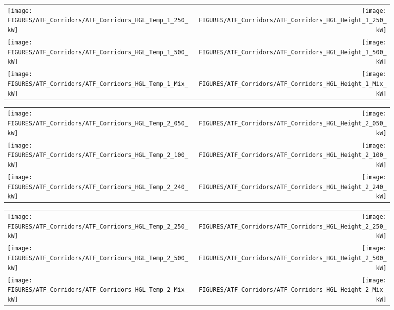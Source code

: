 \begin{figure}
\begin{tabular*}{\textwidth}{l@{\extracolsep{\fill}}r}
\texttt{[image: FIGURES/ATF\_Corridors/ATF\_Corridors\_HGL\_Temp\_1\_250\_kW]} &
\texttt{[image: FIGURES/ATF\_Corridors/ATF\_Corridors\_HGL\_Height\_1\_250\_kW]} \\
\texttt{[image: FIGURES/ATF\_Corridors/ATF\_Corridors\_HGL\_Temp\_1\_500\_kW]} &
\texttt{[image: FIGURES/ATF\_Corridors/ATF\_Corridors\_HGL\_Height\_1\_500\_kW]} \\
\texttt{[image: FIGURES/ATF\_Corridors/ATF\_Corridors\_HGL\_Temp\_1\_Mix\_kW]} &
\texttt{[image: FIGURES/ATF\_Corridors/ATF\_Corridors\_HGL\_Height\_1\_Mix\_kW]}
\end{tabular*}
\end{figure}

\begin{figure}
\begin{tabular*}{\textwidth}{l@{\extracolsep{\fill}}r}
\texttt{[image: FIGURES/ATF\_Corridors/ATF\_Corridors\_HGL\_Temp\_2\_050\_kW]} &
\texttt{[image: FIGURES/ATF\_Corridors/ATF\_Corridors\_HGL\_Height\_2\_050\_kW]} \\
\texttt{[image: FIGURES/ATF\_Corridors/ATF\_Corridors\_HGL\_Temp\_2\_100\_kW]} &
\texttt{[image: FIGURES/ATF\_Corridors/ATF\_Corridors\_HGL\_Height\_2\_100\_kW]} \\
\texttt{[image: FIGURES/ATF\_Corridors/ATF\_Corridors\_HGL\_Temp\_2\_240\_kW]} &
\texttt{[image: FIGURES/ATF\_Corridors/ATF\_Corridors\_HGL\_Height\_2\_240\_kW]}
\end{tabular*}
\end{figure}

\begin{figure}
\begin{tabular*}{\textwidth}{l@{\extracolsep{\fill}}r}
\texttt{[image: FIGURES/ATF\_Corridors/ATF\_Corridors\_HGL\_Temp\_2\_250\_kW]} &
\texttt{[image: FIGURES/ATF\_Corridors/ATF\_Corridors\_HGL\_Height\_2\_250\_kW]} \\
\texttt{[image: FIGURES/ATF\_Corridors/ATF\_Corridors\_HGL\_Temp\_2\_500\_kW]} &
\texttt{[image: FIGURES/ATF\_Corridors/ATF\_Corridors\_HGL\_Height\_2\_500\_kW]} \\
\texttt{[image: FIGURES/ATF\_Corridors/ATF\_Corridors\_HGL\_Temp\_2\_Mix\_kW]} &
\texttt{[image: FIGURES/ATF\_Corridors/ATF\_Corridors\_HGL\_Height\_2\_Mix\_kW]}
\end{tabular*}
\end{figure}

